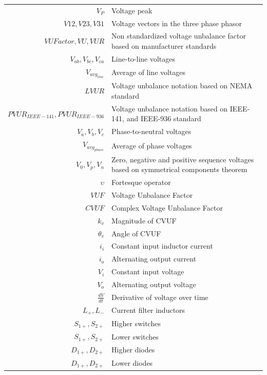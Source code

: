 \begin{scriptsize}
\begin{tabularx}{\textwidth}{r|X}
	$V_P$															& Voltage peak\\
	$V12, V23, V31$										& Voltage vectors in the three phase phasor\\
  $VUFactor,VU,VUR$                	& Non standardized voltage unbalance factor based on manufacturer standards\\
	$V_{ab},V_{bc},V_{ca}$  					& Line-to-line voltages\\
	$V_{avg_{line}}$  								& Average of line voltages\\
	$LVUR$														& Voltage unbalance notation based on NEMA standard\\
	$PVUR_{IEEE-141},PVUR_{IEEE-936}$	& Voltage unbalance notation based on IEEE-141, and IEEE-936 standard\\
	$V_{a},V_{b},V_{c}$  							& Phase-to-neutral voltages\\
	$V_{avg_{phase}}$  								& Average of phase voltages\\
	$V_{0},V_{p},V_{n}$  							& Zero, negative and positive sequence voltages based on symmetrical components theorem\\
  $\upsilon$  											& Fortesque operator\\
	$VUF$  														& Voltage Unbalance Factor\\
	$CVUF$  													& Complex Voltage Unbalance Factor\\
	$k_v$  														& Magnitude of CVUF\\
	$\theta_v$  											& Angle of CVUF\\
	$i_i$															& Constant input inductor current\\
	$i_o$															& Alternating output current\\
	$V_i$															& Constant input voltage\\
	$V_o$															& Alternating output voltage\\
	$\frac{dV}{dt}$										& Derivative of voltage over time\\
	$L_+,L_-$													& Current filter inductors\\
	$S_{1+},S_{2+}$										& Higher switches\\
	$S_{1+},S_{2+}$										& Lower switches\\
	$D_{1+},D_{2+}$										& Higher diodes\\
	$D_{1+},D_{2+}$										& Lower diodes\\

\end{tabularx}
\end{scriptsize}
